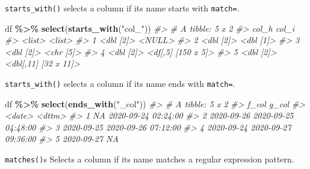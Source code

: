 \documentclass[
]{report}
\newenvironment{Shaded}{\begin{snugshade}}{\end{snugshade}}
\newcommand{\CommentTok}[1]{\textcolor[rgb]{0.56,0.35,0.01}{\textit{#1}}}
\newcommand{\KeywordTok}[1]{\textcolor[rgb]{0.13,0.29,0.53}{\textbf{#1}}}
\newcommand{\NormalTok}[1]{#1}
\newcommand{\OperatorTok}[1]{\textcolor[rgb]{0.81,0.36,0.00}{\textbf{#1}}}
\newcommand{\StringTok}[1]{\textcolor[rgb]{0.31,0.60,0.02}{#1}}
\begin{document}
\texttt{starts\_with()} selects a column if its name starts with \texttt{match=}.

\begin{Shaded}
\begin{Highlighting}[]
\NormalTok{df }\OperatorTok{\%\textgreater{}\%}
\StringTok{  }\KeywordTok{select}\NormalTok{(}\KeywordTok{starts\_with}\NormalTok{(}\StringTok{"col\_"}\NormalTok{))}
\CommentTok{\#\textgreater{} \# A tibble: 5 x 2}
\CommentTok{\#\textgreater{}   col\_h     col\_i               }
\CommentTok{\#\textgreater{}   \textless{}list\textgreater{}    \textless{}list\textgreater{}              }
\CommentTok{\#\textgreater{} 1 \textless{}dbl [2]\textgreater{} \textless{}NULL\textgreater{}              }
\CommentTok{\#\textgreater{} 2 \textless{}dbl [2]\textgreater{} \textless{}dbl [1]\textgreater{}           }
\CommentTok{\#\textgreater{} 3 \textless{}dbl [2]\textgreater{} \textless{}chr [5]\textgreater{}           }
\CommentTok{\#\textgreater{} 4 \textless{}dbl [2]\textgreater{} \textless{}df[,5] [150 x 5]\textgreater{}  }
\CommentTok{\#\textgreater{} 5 \textless{}dbl [2]\textgreater{} \textless{}dbl[,11] [32 x 11]\textgreater{}}
\end{Highlighting}
\end{Shaded}

\texttt{starts\_with()} selects a column if its name ends with \texttt{match=}.

\begin{Shaded}
\begin{Highlighting}[]
\NormalTok{df }\OperatorTok{\%\textgreater{}\%}
\StringTok{  }\KeywordTok{select}\NormalTok{(}\KeywordTok{ends\_with}\NormalTok{(}\StringTok{"\_col"}\NormalTok{))}
\CommentTok{\#\textgreater{} \# A tibble: 5 x 2}
\CommentTok{\#\textgreater{}   f\_col      g\_col              }
\CommentTok{\#\textgreater{}   \textless{}date\textgreater{}     \textless{}dttm\textgreater{}             }
\CommentTok{\#\textgreater{} 1 NA         2020{-}09{-}24 02:24:00}
\CommentTok{\#\textgreater{} 2 2020{-}09{-}26 2020{-}09{-}25 04:48:00}
\CommentTok{\#\textgreater{} 3 2020{-}09{-}25 2020{-}09{-}26 07:12:00}
\CommentTok{\#\textgreater{} 4 2020{-}09{-}24 2020{-}09{-}27 09:36:00}
\CommentTok{\#\textgreater{} 5 2020{-}09{-}27 NA}
\end{Highlighting}
\end{Shaded}

\texttt{matches()}s Selects a column if its name matches a regular expression pattern.
\end{document}

